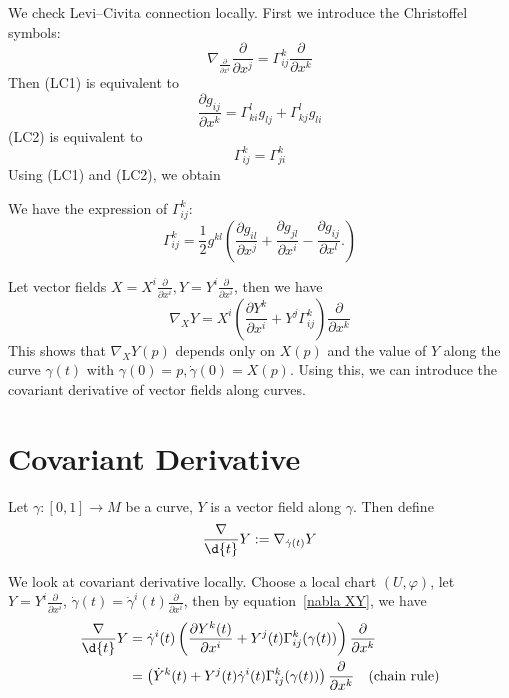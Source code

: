 We check Levi--Civita connection locally.
First we introduce the Christoffel symbols:
\[\nabla_{\frac{\partial{}}{\partial{x^i}}}\frac{\partial{}}{\partial{x^j}}=\Gamma^k_{ij}\frac{\partial{}}{\partial{x^k}}\]
Then (LC1) is equivalent to
\[\frac{\partial{g_{ij}}}{\partial{x^k}}=\Gamma^l_{ki}g_{lj}+\Gamma^l_{kj}g_{li}\]
(LC2) is equivalent to
\[\Gamma^k_{ij}=\Gamma^k_{ji}\]
Using (LC1) and (LC2), we obtain
\begin{prop}
    We have the expression of $\Gamma^k_{ij}$:
    \[\Gamma^k_{ij}=\frac{1}{2}g^{kl}\left(\frac{\partial{g_{il}}}{\partial{x^j}}+\frac{\partial{g_{jl}}}{\partial{x^i}}-\frac{\partial{g_{ij}}}{\partial{x^l}}.\right)\]
\end{prop}

Let vector fields $X=X^i\frac{\partial{}}{\partial{x^i}},Y=Y^i\frac{\partial{}}{\partial{x^i}}$, then we have
\begin{equation}
    \nabla_XY=X^i\left(\frac{\partial{Y^k}}{\partial{x^i}}+Y^j\Gamma^k_{ij}\right)\frac{\partial{}}{\partial{x^k}}\label{nabla XY}
\end{equation}
This shows that $\nabla_XY(p)$ depends only on $X(p)$ and the value of $Y$ along the curve $\gamma(t)$ with $\gamma(0)=p,\dot{\gamma}(0)=X(p)$.
Using this, we can introduce the covariant derivative of vector fields along curves.

\section{Covariant Derivative}
\begin{defn}
    Let $\gamma:[0,1]\to M$ be a curve, $Y$ is a vector field along $\gamma$.
    Then define
    \[\frac{\nabla}{\d{t}}Y:=\nabla_{\dot{\gamma}(t)}Y\]
\end{defn}

We look at covariant derivative locally.
Choose a local chart $(U,\varphi)$, let $Y=Y^i\frac{\partial{}}{\partial{x^i}}$, $\dot{\gamma}(t)=\dot{\gamma}^i(t)\frac{\partial{}}{\partial{x^i}}$, then by equation~\eqref{nabla XY}, we have
\begin{equation}
    \begin{aligned}
        \frac{\nabla}{\d{t}}Y&=\dot{\gamma}^i(t)\left(\frac{\partial{Y^k(t)}}{\partial{x^i}}+Y^j(t)\Gamma^k_{ij}(\gamma(t))\right)\frac{\partial{}}{\partial{x^k}}\\
        &=\left(\dot{Y}^k(t)+Y^j(t)\dot{\gamma}^i(t)\Gamma^k_{ij}(\gamma(t))\right)\frac{\partial{}}{\partial{x^k}}\quad\text{(chain rule)}
    \end{aligned}\label{parallel}
\end{equation}

